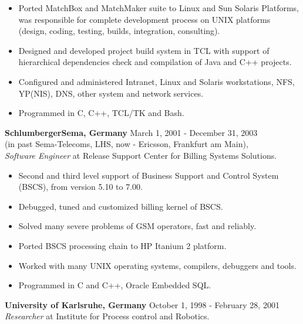 \documentclass[a4paper,12pt,]{article}
\begin{document}
\begin{description}
\begin{itemize}
    \item Ported MatchBox and MatchMaker suite to Linux and Sun Solaris Platforms, was responsible 
      for complete development process on UNIX platforms (design, coding, testing, builds, integration,
      consulting).

    \item Designed and developed project build system in TCL with support of hierarchical
      dependencies check and compilation of Java and C++ projects. 

    \item Configured and administered Intranet, Linux and Solaris workstations, NFS, YP(NIS), 
      DNS, other system and network services.

    \item Programmed in C, C++, TCL/TK and Bash.

    \end{itemize}

  \item{\bfseries SchlumbergerSema, Germany} \hfill March 1, 2001 - December 31, 2003 \\ 
    (in past Sema-Telecoms, LHS, now - Ericsson, Frankfurt am Main), \\
    {\em Software Engineer} at Release Support Center for Billing Systems Solutions.
    
    \begin{itemize}
      
    \item Second and third level support of Business Support and Control System (BSCS),
      from version 5.10 to 7.00.
      
    \item Debugged, tuned and customized billing kernel of BSCS.

    \item Solved many severe problems of GSM operators, fast and reliably.

    \item Ported BSCS processing chain to HP Itanium 2 platform.
      
    \item Worked with many UNIX operating systems, compilers, debuggers and tools.

    \item Programmed in C and C++, Oracle Embedded SQL.

    \end{itemize}
    
  \item{\bfseries University of Karlsruhe, Germany} \hfill October 1, 1998 - February 28, 2001 \\ 
    {\em Researcher} at Institute for Process control and Robotics.
    

\end{description}
\end{document}
